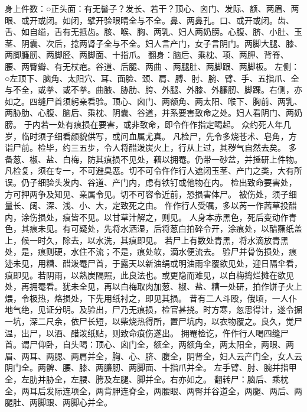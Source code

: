 \documentclass[12pt,UTF8]{ctexbook}
\begin{document}
身上件数：○正头面：有无髻子？发长、若干？顶心、囟门、发际、额、两眉、两眼、或开或闭。如闭，擘开验眼睛全与不全。鼻、两鼻孔。口、或开或闭。齿、舌、如自缢，舌有无抵齿。胲、喉、胸、两乳、妇人两奶膀。心腹、脐、小肚、玉茎、阴囊、次后，捻两肾子全与不全。妇人言产门，女子言阴门。两脚大腿、膝、两脚臁肕、两脚胫、两脚面、十指爪。
翻身：脑后、乘枕、项、两胛、背脊、腰、两臀瓣、有无杖疤。谷道、后腿、两曲 、两腿肚、两脚跟、两脚板。
左侧：○左顶下、脑角、太阳穴、耳、面脸、颈、肩、膊、肘、腕、臂、手、五指爪、全与不全，或拳、或不拳。曲腋、胁肋、胯、外腿、外膝、外臁肕、脚踝。右侧，亦如之。四缝尸首须躬亲看验。顶心、囟门、两额角、两太阳、喉下、胸前、两乳、两胁肋、心腹、脑后、乘枕、阴囊、谷道，并系要害致命之处。妇人看阴门、两奶膀。
于内若一处有痕损在要害，或非致命，即令仵作指定喝起。
众约死人年几岁，临时须子细看颜貌供写，或问血属尤真。
凡检尸，先令多烧苍术、皂角，方诣尸前。检毕，约三五步，令人将醋泼炭火上，行从上过，其秽气自然去矣。
多备葱、椒、盐、白梅，防其痕损不见处，藉以拥罨。仍带一砂盆，并捶研上件物。
凡检复，须在专一，不可避臭恶。切不可令仵作行人遮闭玉茎、产门之类，大有所误。仍子细验头发内、谷道、产门内，虑有铁钉或他物在内。
检出致命要害处，方可押两争及知见、亲属令见。切不可容令近前，恐损害体尸。
被伤处，须子细量长、阔、深、浅、小、大，定致死之由。
仵作行人受嘱，多以芮一作茜草投醋内，涂伤损处，痕皆不见。以甘草汁解之，则见。
人身本赤黑色，死后变动作青 色，其痕未见。有可疑处，先将水洒湿，后将葱白拍碎令开，涂痕处，以醋蘸纸盖上，候一时久，除去，以水洗，其痕即见。
若尸上有数处青黑，将水滴放青黑处，是，痕则硬，水住不流；不是，痕处软，滴水便流去。
验尸并骨伤损处，痕迹未见，用糟、醋泼罨尸首，于露天以新油绢或明油雨伞覆欲见处，迎日隔伞看，痕即见。若阴雨，以熟炭隔照，此良法也。或更隐而难见，以白梅捣烂摊在欲见处，再拥罨看。犹未全见，再以白梅取肉加葱、椒、盐、糟一处研，拍作饼子火上煨，令极热，烙损处，下先用纸衬之，即见其损。
昔有二人斗殴，俄顷，一人仆地气绝，见证分明。及验出，尸乃无痕损，检官甚挠。时方寒，忽思得计，遂令掘一坑，深二尺余，依尸长短，以柴烧热得所，置尸坑内，以衣物覆之。良久，觉尸温，出尸，以酒、醋泼纸贴，则致命痕伤遂出。
拥罨检讫，仵作行人喝四缝尸首。谓尸仰卧，自头喝：顶心、囟门全，额全，两额角全，两太阳全，两眼、两眉、两耳、两腮、两肩并全，胸、心、脐、腹全，阴肾全，妇人云产门全，女人云阴门全。两髀、腰、膝、两臁肕、两脚面、十指爪并全。
左手臂、肘、腕并指甲全，左肋并胁全，左腰、胯及左腿、脚并全。右亦如之。
翻转尸：脑后、乘枕全，两耳后发际连项全，两背胛连脊全，两腰眼、两臀并谷道全，两腿、两后、两腿肚、两脚跟、两脚心并全。
\end{document}
